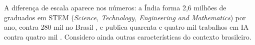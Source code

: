 A diferença de escala aparece nos números: a Índia forma 2,6 milhões de graduados em STEM (\textit{Science, Technology, Engineering and Mathematics}) por ano, contra 280 mil no Brasil \parencite{Buchholz2023}, e publica quarenta e quatro mil trabalhos em IA contra quatro mil \parencite{Giattino2023AIpublications}. Considero ainda outras características do contexto brasileiro. %

